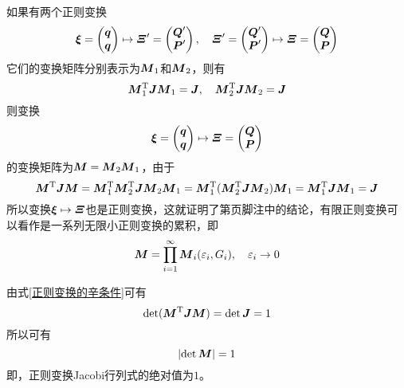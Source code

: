 如果有两个正则变换
\begin{equation*}
	\boldsymbol{\xi} = \begin{pmatrix} \boldsymbol{q} \\ \boldsymbol{q} \end{pmatrix} \mapsto \boldsymbol{\varXi}' = \begin{pmatrix} \boldsymbol{Q}' \\ \boldsymbol{P}' \end{pmatrix},\quad \boldsymbol{\varXi}' = \begin{pmatrix} \boldsymbol{Q}' \\ \boldsymbol{P}' \end{pmatrix} \mapsto \boldsymbol{\varXi} = \begin{pmatrix} \boldsymbol{Q} \\ \boldsymbol{P} \end{pmatrix}
\end{equation*}
它们的变换矩阵分别表示为$\boldsymbol{M}_1$和$\boldsymbol{M}_2$，则有
\begin{equation}
	\boldsymbol{M}_1^{\mathrm{T}} \boldsymbol{J} \boldsymbol{M}_1 = \boldsymbol{J},\quad \boldsymbol{M}_2^{\mathrm{T}} \boldsymbol{J} \boldsymbol{M}_2 = \boldsymbol{J}
\end{equation}
则变换
\begin{equation*}
	\boldsymbol{\xi} = \begin{pmatrix} \boldsymbol{q} \\ \boldsymbol{q} \end{pmatrix} \mapsto \boldsymbol{\varXi} = \begin{pmatrix} \boldsymbol{Q} \\ \boldsymbol{P} \end{pmatrix}
\end{equation*}
的变换矩阵为$\boldsymbol{M}=\boldsymbol{M}_2\boldsymbol{M}_1$，由于
\begin{equation}
	\boldsymbol{M}^{\mathrm{T}}\boldsymbol{J}\boldsymbol{M} = \boldsymbol{M}_1^{\mathrm{T}}\boldsymbol{M}_2^{\mathrm{T}}\boldsymbol{J} \boldsymbol{M}_2\boldsymbol{M}_1 = \boldsymbol{M}_1^{\mathrm{T}}(\boldsymbol{M}_2^{\mathrm{T}}\boldsymbol{J} \boldsymbol{M}_2)\boldsymbol{M}_1 = \boldsymbol{M}_1^{\mathrm{T}} \boldsymbol{J} \boldsymbol{M}_1 = \boldsymbol{J}
\end{equation}
所以变换$\boldsymbol{\xi}\mapsto \boldsymbol{\varXi}$也是正则变换，这就证明了第\pageref{chapter10:footnote-正则变换的传递性}页脚注中的结论，有限正则变换可以看作是一系列无限小正则变换的累积，即
\begin{equation}
	\boldsymbol{M} = \prod_{i=1}^\infty \boldsymbol{M}_i(\varepsilon_i,G_i),\quad \varepsilon_i \to 0
\end{equation}

由式\eqref{正则变换的辛条件}可有
\begin{equation*}
	\det(\boldsymbol{M}^{\mathrm{T}} \boldsymbol{J} \boldsymbol{M}) = \det \boldsymbol{J} = 1
\end{equation*}
所以可有
\begin{equation}
	\left|\det \boldsymbol{M}\right| = 1
\end{equation}
即，正则变换Jacobi行列式的绝对值为$1$。


